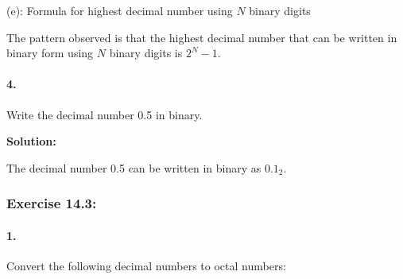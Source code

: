 \documentclass{article}
\begin{document}
\noindent (e): Formula for highest decimal number using $N$ binary digits

\vspace*{0.25cm}

\noindent The pattern observed is that the highest decimal number that can be written in binary form using $N$ binary digits is $2^N - 1$.

\vspace*{0.5cm}

\paragraph {4.}
Write the decimal number 0.5 in binary.

\vspace*{0.5cm}

\noindent \textbf{Solution:}

\vspace*{0.25cm}

\noindent The decimal number 0.5 can be written in binary as $0.1_2$.

\vspace*{0.5cm}


\newpage

\subsubsection*{Exercise 14.3:}

\paragraph*{1.}
Convert the following decimal numbers to octal numbers:

\vspace*{0.25cm}
\end{document}
